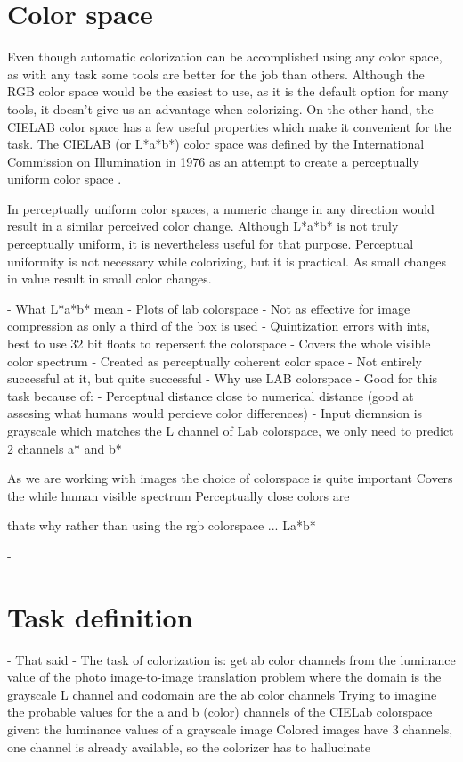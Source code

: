 \section{Color space}

Even though automatic colorization can be accomplished using any color space, 
as with any task some tools are better for the job than others. Although the 
RGB color space would be the easiest to use, as it is the default option for 
many tools, it doesn't give us an advantage when colorizing. On the other hand, 
the CIELAB color space has a few useful properties which make it convenient 
for the task. The CIELAB (or L*a*b*) color space was defined by the 
International Commission on Illumination in 1976 as an attempt to create a 
perceptually uniform color space \citep{icc2004cielab}. 

In perceptually uniform color spaces, a numeric change in any direction 
would result in a similar perceived color change. Although L*a*b* is not truly 
perceptually uniform, it is nevertheless useful for that purpose. Perceptual 
uniformity is not necessary while colorizing, but it is practical. As small 
changes in value result in small color changes.


- What L*a*b* mean
- Plots of lab colorspace
- Not as effective for image compression as only a third of the box is used
- Quintization errors with ints, best to use 32 bit floats to repersent the colorspace
- Covers the whole visible color spectrum
- Created as perceptually coherent color space
- Not entirely successful at it, but quite successful
- Why use LAB colorspace
- Good for this task because of:
    - Perceptual distance close to numerical distance (good at assesing what humans would percieve color differences)
    - Input diemnsion is grayscale which matches the L channel of Lab colorspace, we only need to predict 2 channels a* and b*

As we are working with images the choice of colorspace is quite important 
Covers the while human visible spectrum
Perceptually close colors are 

thats why rather than using the rgb colorspace ...  La*b*


- 



\section{Task definition}



- That said
- The task of colorization is:
    get ab color channels from the luminance value of the photo
    image-to-image translation problem where the domain is the grayscale L channel and codomain are the ab color channels 
    Trying to imagine the probable values for the a and b (color) channels
    of the CIELab colorspace givent the luminance values of a grayscale image
    Colored images have 3 channels, one channel is already available, so the colorizer has to 
    hallucinate



